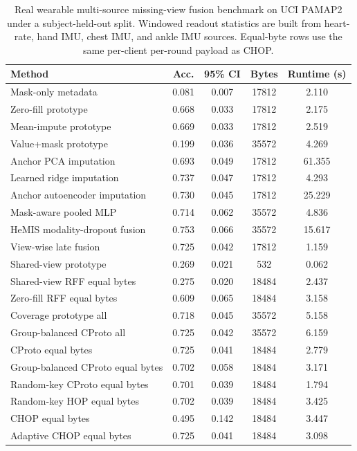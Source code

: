 \begin{table}[t]
\centering
\caption{Real wearable multi-source missing-view fusion benchmark on UCI PAMAP2 under a subject-held-out split. Windowed readout statistics are built from heart-rate, hand IMU, chest IMU, and ankle IMU sources. Equal-byte rows use the same per-client per-round payload as CHOP.}
\label{tab:if-pamap2-fusion}
\scriptsize
\setlength{\tabcolsep}{3pt}
\renewcommand{\arraystretch}{0.94}
\begin{tabular}{lcccc}
\toprule
Method & Acc. & 95\% CI & Bytes & Runtime (s) \\
\midrule
Mask-only metadata & 0.081 & 0.007 & 17812 & 2.110 \\
Zero-fill prototype & 0.668 & 0.033 & 17812 & 2.175 \\
Mean-impute prototype & 0.669 & 0.033 & 17812 & 2.519 \\
Value+mask prototype & 0.199 & 0.036 & 35572 & 4.269 \\
Anchor PCA imputation & 0.693 & 0.049 & 17812 & 61.355 \\
Learned ridge imputation & 0.737 & 0.047 & 17812 & 4.293 \\
Anchor autoencoder imputation & 0.730 & 0.045 & 17812 & 25.229 \\
Mask-aware pooled MLP & 0.714 & 0.062 & 35572 & 4.836 \\
HeMIS modality-dropout fusion & 0.753 & 0.066 & 35572 & 15.617 \\
View-wise late fusion & 0.725 & 0.042 & 17812 & 1.159 \\
Shared-view prototype & 0.269 & 0.021 & 532 & 0.062 \\
Shared-view RFF equal bytes & 0.275 & 0.020 & 18484 & 2.437 \\
Zero-fill RFF equal bytes & 0.609 & 0.065 & 18484 & 3.158 \\
Coverage prototype all & 0.718 & 0.045 & 35572 & 5.158 \\
Group-balanced CProto all & 0.725 & 0.042 & 35572 & 6.159 \\
CProto equal bytes & 0.725 & 0.041 & 18484 & 2.779 \\
Group-balanced CProto equal bytes & 0.702 & 0.058 & 18484 & 3.171 \\
Random-key CProto equal bytes & 0.701 & 0.039 & 18484 & 1.794 \\
Random-key HOP equal bytes & 0.702 & 0.039 & 18484 & 3.425 \\
CHOP equal bytes & 0.495 & 0.142 & 18484 & 3.447 \\
Adaptive CHOP equal bytes & 0.725 & 0.041 & 18484 & 3.098 \\
\bottomrule
\end{tabular}
\end{table}
